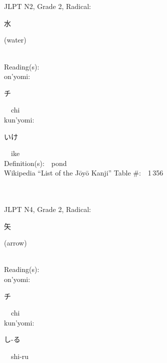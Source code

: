 \begin{multicols}{2}
\ \ \\
{\fontsize{34pt}{40pt}  }\ \ \\  %
{JLPT N2, Grade 2, Radical:\ \ {\begin{CJK}{UTF8}{min} 水 \end{CJK}} (water) } \\
Reading(s):\ \ \\
{\hspace*{1em}}on'yomi:\ \ \\
{\hspace*{2em}}{\begin{CJK}{UTF8}{min} チ \end{CJK}}\ \ chi\ \ \\
{\hspace*{1em}}kun'yomi:\ \ \\
{\hspace*{2em}}{\begin{CJK}{UTF8}{min} いけ \end{CJK}}\ \ ike\ \ \\
Definition(s):\ \ pond \\
Wikipedia ``List of the J\=oy\=o Kanji'' Table \#:\ \ 1\,356 \\
\ \ \\
{\fontsize{34pt}{40pt}  }\ \ \\  %
{JLPT N4, Grade 2, Radical:\ \ {\begin{CJK}{UTF8}{min} 矢 \end{CJK}} (arrow) } \\
Reading(s):\ \ \\
{\hspace*{1em}}on'yomi:\ \ \\
{\hspace*{2em}}{\begin{CJK}{UTF8}{min} チ \end{CJK}}\ \ chi\ \ \\
{\hspace*{1em}}kun'yomi:\ \ \\
{\hspace*{2em}}{\begin{CJK}{UTF8}{min} し-る \end{CJK}}\ \ shi-ru\ \ \\

\end{multicols}
